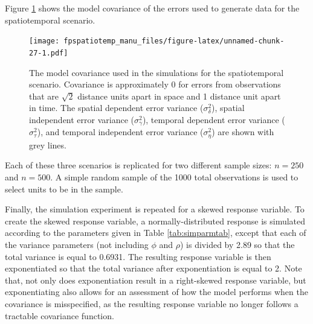 \documentclass[]{interact}
\theoremstyle{plain}%
\theoremstyle{definition}
\theoremstyle{remark}
\begin{document}
Figure \ref{fig:simcovplot} shows the model covariance of the errors
used to generate data for the spatiotemporal scenario.

\begin{figure}
\centering
\texttt{[image: fpspatiotemp\_manu\_files/figure-latex/unnamed-chunk-27-1.pdf]}
\caption{\label{fig:simcovplot} The model covariance used in the
simulations for the spatiotemporal scenario. Covariance is approximately
0 for errors from observations that are \(\sqrt2\) distance units apart
in space and 1 distance unit apart in time. The spatial dependent error
variance (\(\sigma^2_{\delta}\)), spatial independent error variance
(\(\sigma^2_{\gamma}\)), temporal dependent error variance
(\(\sigma^2_{\tau}\)), and temporal independent error variance
(\(\sigma^2_{\eta}\)) are shown with grey lines.}
\end{figure}

Each of these three scenarios is replicated for two different sample
sizes: \(n = 250\) and \(n = 500\). A simple random sample of the 1000
total observations is used to select units to be in the sample.

Finally, the simulation experiment is repeated for a skewed response
variable. To create the skewed response variable, a normally-distributed
response is simulated according to the parameters given in Table
\ref{tab:simparmtab}, except that each of the variance parameters (not
including \(\phi\) and \(\rho\)) is divided by 2.89 so that the total
variance is equal to 0.6931. The resulting response variable is then
exponentiated so that the total variance after exponentiation is equal
to 2. Note that, not only does exponentiation result in a right-skewed
response variable, but exponentiating also allows for an assessment of
how the model performs when the covariance is misspecified, as the
resulting response variable no longer follows a tractable covariance
function.
\end{document}
